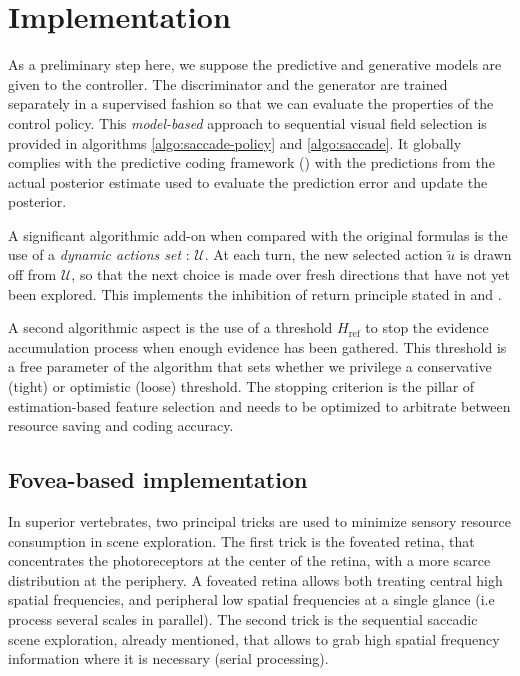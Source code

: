 \documentclass{article} %
\begin{document}
\section{Implementation}

As a preliminary step here, we suppose the predictive and generative models are given to the controller. The discriminator and the generator are trained separately in a supervised fashion so that we can evaluate the properties of the control policy.  This \emph{model-based} approach to sequential visual field selection is provided in algorithms \ref{algo:saccade-policy} and \ref{algo:saccade}. It globally complies with the predictive coding framework (\cite{rao1999predictive}) with the predictions from the actual posterior estimate used to evaluate the prediction error and update the posterior.


A significant algorithmic add-on when compared with the original formulas is the use of a \emph{dynamic actions set} : $\mathcal{U}$. At each turn, the new selected action $\tilde{u}$ is drawn off from $\mathcal{U}$, so that the next choice is made over fresh directions that have not yet been explored. This implements the inhibition of return principle stated in \cite{itti2001computational} and \cite{friston2012perceptions}.

A second algorithmic aspect is the use of a threshold $H_\text{ref}$ to stop the evidence accumulation process when enough evidence has been gathered. This threshold is a free parameter of the algorithm that sets whether we privilege a conservative (tight) or optimistic (loose) threshold. The stopping criterion is the pillar of estimation-based feature selection and needs to be optimized to arbitrate between resource saving and coding accuracy. 


\subsection{Fovea-based implementation}


In superior vertebrates, two principal tricks are used to minimize sensory resource consumption in scene exploration. The first trick is the foveated retina, that concentrates the photoreceptors at the center of the retina, with a more scarce distribution at the periphery. A foveated retina allows both treating central high spatial frequencies, and peripheral low spatial frequencies at a single glance (i.e process several scales in parallel). The second trick is the sequential saccadic scene exploration, already mentioned, that allows to grab high spatial frequency information where it is necessary (serial processing). 
\end{document}
